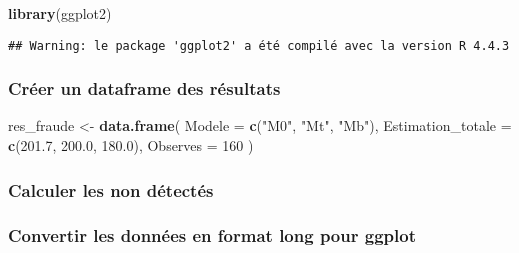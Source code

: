 \documentclass[
]{article}
\newenvironment{Shaded}{\begin{snugshade}}{\end{snugshade}}
\newcommand{\AttributeTok}[1]{\textcolor[rgb]{0.13,0.29,0.53}{#1}}
\newcommand{\DecValTok}[1]{\textcolor[rgb]{0.00,0.00,0.81}{#1}}
\newcommand{\FloatTok}[1]{\textcolor[rgb]{0.00,0.00,0.81}{#1}}
\newcommand{\FunctionTok}[1]{\textcolor[rgb]{0.13,0.29,0.53}{\textbf{#1}}}
\newcommand{\NormalTok}[1]{#1}
\newcommand{\OtherTok}[1]{\textcolor[rgb]{0.56,0.35,0.01}{#1}}
\newcommand{\SpecialCharTok}[1]{\textcolor[rgb]{0.81,0.36,0.00}{\textbf{#1}}}
\newcommand{\StringTok}[1]{\textcolor[rgb]{0.31,0.60,0.02}{#1}}
\begin{document}
\begin{Shaded}
\begin{Highlighting}[]
\FunctionTok{library}\NormalTok{(ggplot2)}
\end{Highlighting}
\end{Shaded}

\begin{verbatim}
## Warning: le package 'ggplot2' a été compilé avec la version R 4.4.3
\end{verbatim}

\subsubsection{Créer un dataframe des
résultats}\label{cruxe9er-un-dataframe-des-ruxe9sultats}

\begin{Shaded}
\begin{Highlighting}[]
\NormalTok{res\_fraude }\OtherTok{\textless{}{-}} \FunctionTok{data.frame}\NormalTok{(}
  \AttributeTok{Modele =} \FunctionTok{c}\NormalTok{(}\StringTok{"M0"}\NormalTok{, }\StringTok{"Mt"}\NormalTok{, }\StringTok{"Mb"}\NormalTok{),}
  \AttributeTok{Estimation\_totale =} \FunctionTok{c}\NormalTok{(}\FloatTok{201.7}\NormalTok{, }\FloatTok{200.0}\NormalTok{, }\FloatTok{180.0}\NormalTok{),}
  \AttributeTok{Observes =} \DecValTok{160}
\NormalTok{)}
\end{Highlighting}
\end{Shaded}

\subsubsection{Calculer les non
détectés}\label{calculer-les-non-duxe9tectuxe9s}

\begin{Shaded}
\end{Shaded}

\subsubsection{Convertir les données en format long pour
ggplot}\label{convertir-les-donnuxe9es-en-format-long-pour-ggplot}
\end{document}
